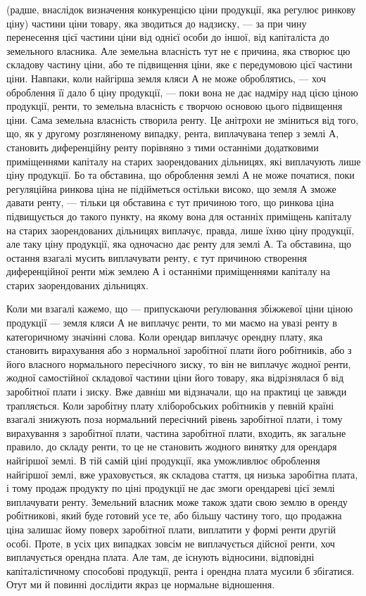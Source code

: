 \parcont{}  %
(радше, внаслідок визначення конкуренцією ціни продукції, яка регулює ринкову
ціну) частини ціни товару, яка зводиться до надзиску, — за при чину перенесення
цієї частини ціни від однієї особи до іншої, від капіталіста до
земельного власника. Але земельна власність тут не є причина, яка створює
цю складову частину ціни, або те підвищення ціни, яке є передумовою цієї
частини ціни. Навпаки, коли найгірша земля кляси А не може оброблятись, —
хоч оброблення її дало б ціну продукції, — поки вона не дає надміру над цією
ціною продукції, ренти, то земельна власність є творчою основою цього підвищення
ціни. Сама земельна власність створила ренту. Це анітрохи не
зміниться від того, що, як у другому розгляненому випадку, рента, виплачувана
тепер з землі А, становить диференційну ренту порівняно з тими останніми
додатковими приміщеннями капіталу на старих заорендованих дільницях, які
виплачують лише ціну продукції. Бо та обставина, що оброблення землі А
не може початися, поки регуляційна ринкова ціна не підійметься остільки високо,
що земля А зможе давати ренту, — тільки ця обставина є тут причиною
того, що ринкова ціна підвищується до такого пункту, на якому вона для
останніх приміщень капіталу на старих заорендованих дільницях виплачує,
правда, лише їхню ціну продукції, але таку ціну продукції, яка одночасно
дає ренту для землі А. Та обставина, що остання взагалі мусить виплачувати
ренту, є тут причиною створення диференційної ренти між землею А і останніми
приміщеннями капіталу на старих заорендованих дільницях.

Коли ми взагалі кажемо, що — припускаючи реґулювання збіжжевої ціни
ціною продукції — земля кляси А не виплачує ренти, то ми маємо на увазі
ренту в категоричному значінні слова. Коли орендар виплачує орендну плату,
яка становить вирахування або з нормальної заробітної плати його робітників,
або з його власного нормального пересічного зиску, то він не виплачує жодної
ренти, жодної самостійної складової частини ціни його товару, яка відрізнялася б
від заробітної плати і зиску. Вже давніш ми відзначали, що на практиці це
завжди трапляється. Коли заробітну плату хліборобських робітників у певній
країні взагалі знижують поза нормальний пересічний рівень заробітної плати,
і тому вирахування з заробітної плати, частина заробітної плати, входить, як
загальне правило, до складу ренти, то це не становить жодного винятку для
орендаря найгіршої землі. В тій самій ціні продукції, яка уможливлює оброблення
найгіршої землі, вже ураховується, як складова стаття, ця низька заробітна
плата, і тому продаж продукту по ціні продукції не дає змоги орендареві
цієї землі виплачувати ренту. Земельний власник може також здати свою землю
в оренду робітникові, який буде готовий усе те, або більшу частину того, що
продажна ціна залишає йому поверх заробітної плати, виплатити у формі
ренти другій особі. Проте, в усіх цих випадках зовсім не виплачується дійсної
ренти, хоч виплачується орендна плата. Але там, де існують відносини, відповідні
капіталістичному способові продукції, рента і орендна плата мусили б
збігатися. Отут ми й повинні дослідити якраз це нормальне відношення.

